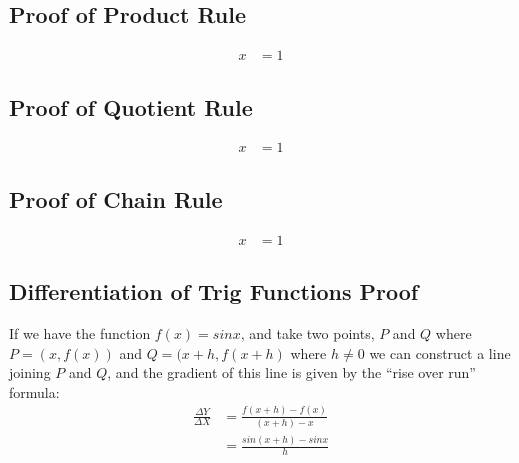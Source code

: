 \subsection{Proof of Product Rule}
\label{sec:ProofOfProductRule}
\begin{align} 
  \label{eq:ProofOfProductRule}
  x & = 1
\end{align}
\newpage
\subsection{Proof of Quotient Rule}
\label{sec:ProofOfQuotientRule}
\begin{align}
  \label{eq:ProofOfQuotientRule}
  x & = 1
\end{align}
\newpage
\subsection{Proof of Chain Rule}
\label{sec:ProofOfChainRule}
\begin{align}
  \label{eq:ProofOfChainRule}
  x & = 1
\end{align}
\newpage
\subsection{Differentiation of Trig Functions Proof}
\label{sec:DiffTrigProof}
If we have the function $f(x) = sinx$, and take two points, $P$ and $Q$ where
$P = (x,f(x))$ and $Q = (x+h, f(x+h)$ where $h \neq 0$ we can construct a line
joining $P$ and $Q$, and the gradient of this line is given by the ``rise
over run'' formula:
\begin{align}
  \frac{\Delta Y}{\Delta X} & = \frac{f(x+h) - f(x)}{(x+h) - x} \\
                            & = \frac{sin(x+h) - sinx}{h}
\end{align}
\newpage
